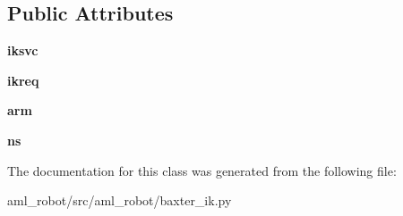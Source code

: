 \subsection*{Public Attributes}
\begin{DoxyCompactItemize}
\item 
\hypertarget{classaml__robot_1_1baxter__ik_1_1_i_k_baxter_a8febd21258f15a3721ecdddd275c9bef}{}\label{classaml__robot_1_1baxter__ik_1_1_i_k_baxter_a8febd21258f15a3721ecdddd275c9bef} 
{\bfseries iksvc}
\item 
\hypertarget{classaml__robot_1_1baxter__ik_1_1_i_k_baxter_ac3a37bd5bdcafced7d11cff004d5a5da}{}\label{classaml__robot_1_1baxter__ik_1_1_i_k_baxter_ac3a37bd5bdcafced7d11cff004d5a5da} 
{\bfseries ikreq}
\item 
\hypertarget{classaml__robot_1_1baxter__ik_1_1_i_k_baxter_a31eb6a0623788ecb628c413f6c1cf85a}{}\label{classaml__robot_1_1baxter__ik_1_1_i_k_baxter_a31eb6a0623788ecb628c413f6c1cf85a} 
{\bfseries arm}
\item 
\hypertarget{classaml__robot_1_1baxter__ik_1_1_i_k_baxter_a006f01e493d58ff9db613d66baa07a63}{}\label{classaml__robot_1_1baxter__ik_1_1_i_k_baxter_a006f01e493d58ff9db613d66baa07a63} 
{\bfseries ns}
\end{DoxyCompactItemize}


The documentation for this class was generated from the following file\+:\begin{DoxyCompactItemize}
\item 
aml\+\_\+robot/src/aml\+\_\+robot/baxter\+\_\+ik.\+py\end{DoxyCompactItemize}
